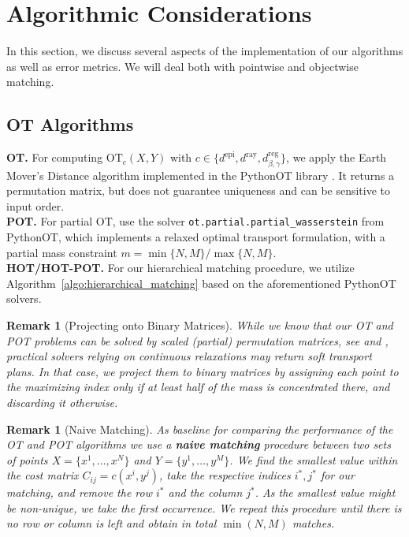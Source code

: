 \documentclass[10pt, twocolumn]{article}
\newtheorem{remark}[theorem]{Remark}
\theoremstyle{definition}
\begin{document}
\section{Algorithmic Considerations} \label{sec:algo}

In this section, we discuss several aspects of the implementation of our algorithms as well as error metrics. We will deal both with pointwise  and objectwise matching.
%
\subsection{OT Algorithms}
%
\textbf{OT.}
For computing $\text{OT}_c(X,Y)$  with $c \in \{d^{\text{epi}},d^{\text{ray}},d^\mathrm{reg}_{\beta,\gamma}\}$,
we apply the {Earth Mover's Distance} algorithm \cite{Bonneel2011} implemented in the PythonOT library \cite{flamary2021pot}.
It returns a permutation matrix, but does not guarantee uniqueness and can be sensitive to input order.
\\[1ex]
\textbf{POT.}
For partial OT, use the solver \texttt{ot.partial.partial\_wasserstein}  \cite{caffarelli2010free,Chapel2020} from PythonOT, which implements a relaxed optimal transport formulation, with a partial mass constraint $m={\min\{N, M\}}/{\max\{N, M\}}$.
\\[1ex]
\textbf{HOT/HOT-POT.}
For our hierarchical matching procedure, we utilize Algorithm~\ref{algo:hierarchical_matching} based on the aforementioned PythonOT solvers.

\begin{remark}[Projecting onto Binary Matrices]
While we know that our OT and POT problems can be solved by scaled (partial) permutation matrices, see \cite[Prop. 2.1]{COTFNT}  and \cite[Thm. 4.1]{bai2023sliced},
practical solvers relying on continuous relaxations may return soft transport plans.
In that case, we project them to binary matrices by assigning each point to the maximizing index only if at least half of the mass is concentrated there, and discarding it otherwise.
\end{remark}

\begin{remark}[Naive Matching]\label{rem:naive}
As baseline for comparing the performance of the OT and POT algorithms 
we use a \textbf{naive matching} procedure between two sets of points $X = \{x^1, \ldots, x^N\}$ and $Y = \{y^1, \ldots, y^M\}$.
We find the smallest value within the cost matrix $C_{ij} = c(x^i, y^j)$, take the respective indices $i^*,j^*$ for our matching, and remove the row $i^*$ and the column $j^*$.
As the smallest value might be non-unique, we take the first occurrence.
We repeat this procedure until there is no row or column is left and obtain in total $\min(N,M)$ matches.
\end{remark}
\end{document}
